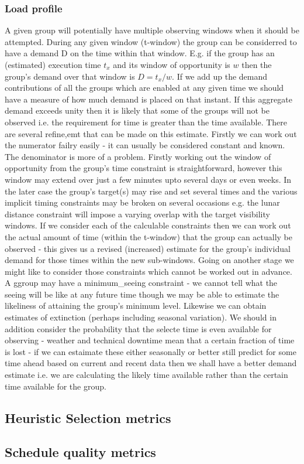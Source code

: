 \subsubsection{Load profile}
A given group will potentially have multiple observing windows when it should be attempted. During any given window (t-window) the group can be considerred to have a demand D on the time within that window. E.g. if the group has an (estimated) execution time $t_x$ and its window of opportunity is $w$ then the group's demand over that window is $D=t_x/w$. If we add up the demand contributions of all the groups which are enabled at any given time we should have a measure of how much demand is placed on that instant. If this aggregate demand exceeds unity then it is likely that some of the groups will not be observed i.e. the requirement for time is greater than the time available. There are several refine,emt that can be made on this estimate. Firstly we can work out the numerator failry easily - it can usually be considered constant and known. The denominator is more of a problem. Firstly working out the window of opportunity from the group's time constraint is straightforward, however this window may extend over just a few minutes upto several days or even weeks. In the later case the group's target(s) may rise and set several times and the various implicit timing constraints may be broken on several occasions e.g. the lunar distance constraint will impose a varying overlap with the target visibility windows. If we consider each of the calculable constraints then we can work out the actual amount of time (within the t-window) that the group can actually be observed - this gives us a revised (increased) estimate for the group's individual demand for those times within the new sub-windows. Going on another stage we might like to consider those constraints which cannot be worked out in advance. A ggroup may have a minimum\_seeing constraint - we cannot tell what the seeing will be like at any future time though we may be able to estimate the likeliness of attaining the group's minimum level. Likewise we can obtain estimates of extinction (perhaps including seasonal variation). We should in addition consider the probability that the selecte time is even available for observing - weather and technical downtime mean that a certain fraction of time is lost - if we can estaimate these either seasonally or better still predict for some time ahead based on current and recent data then we shall have a better demand estimate i.e. we are calculating the likely time available rather than the certain time available for the group. 




\subsection{Heuristic Selection metrics}



\subsection{Schedule quality metrics}
